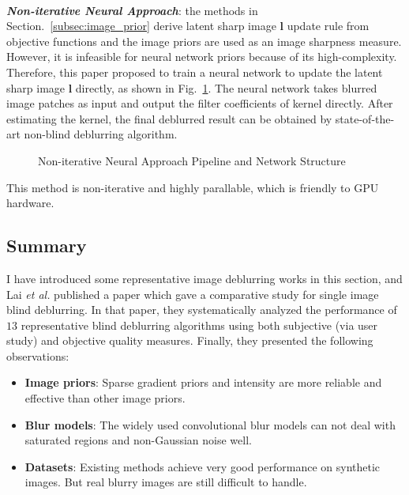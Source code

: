 \documentclass[journal, onecolumn, 10pt]{IEEEtran}
\begin{document}
~\\
\textbf{\emph{Non-iterative Neural Approach}}\cite{chakrabarti2016neural}: the methods in Section.~\ref{subsec:image_prior} derive latent sharp image $\mathbf{l}$ update rule from objective functions and the image priors are used as an image sharpness measure. However, it is infeasible for neural network priors because of its high-complexity. Therefore, this paper proposed to train a neural network to update the latent sharp image  $\mathbf{l}$ directly, as shown in Fig.~\ref{fig:non_iterative_nn}. The neural network takes blurred image patches as input and output the filter coefficients of kernel directly. After estimating the kernel, the final deblurred result can be obtained by state-of-the-art non-blind deblurring algorithm.
\begin{figure}[h!]
\centering
{}
\hspace{\fill}
\hspace{\fill}
\caption{Non-iterative Neural Approach Pipeline and Network Structure}
\label{fig:non_iterative_nn}
\end{figure}
This method is non-iterative and highly parallable, which is friendly to GPU hardware.

\subsection{Summary}
I have introduced some representative image deblurring works in this section, and Lai \emph{et al.} published a paper which gave a comparative study for single image blind deblurring\cite{lai2016comparative}. In that paper, they systematically analyzed the performance of $13$ representative blind deblurring algorithms using both subjective (via user study) and objective quality measures. Finally, they presented the following observations:
\begin{itemize}
\item \textbf{Image priors}: Sparse gradient priors \cite{xu2013unnatural} and intensity \cite{pan2014deblurring} are more reliable and effective than other image priors.
\item \textbf{Blur models}: The widely used convolutional blur models can not deal with saturated regions and non-Gaussian noise well.
\item \textbf{Datasets}: Existing methods achieve very good performance on synthetic images. But real blurry images are still difficult to handle.
\end{itemize}
\end{document}
